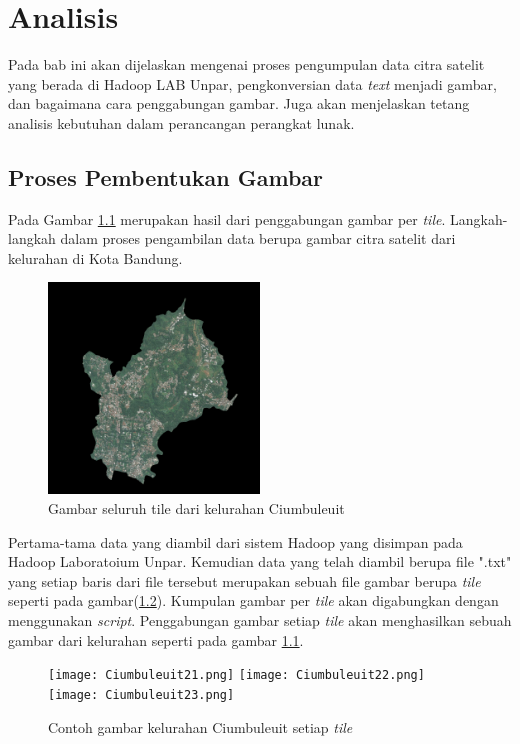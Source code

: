 \chapter{Analisis}
\label{chap:analisis}
Pada bab ini akan dijelaskan mengenai proses pengumpulan data citra satelit yang berada di Hadoop LAB Unpar, pengkonversian data \textit{text} menjadi gambar, dan bagaimana cara penggabungan gambar. Juga akan menjelaskan tetang analisis kebutuhan dalam perancangan perangkat lunak. 

\section{Proses Pembentukan Gambar}
Pada Gambar \ref{fig:ciumbuleuit} merupakan hasil dari penggabungan gambar per \textit{tile}. Langkah-langkah dalam proses pengambilan data berupa gambar citra satelit dari kelurahan di Kota Bandung. 
\begin{figure}[H]
	\centering
	\includegraphics[width=0.5\textwidth]{Gambar/Ciumbuleuit.png}
	\caption{Gambar seluruh tile dari kelurahan Ciumbuleuit}
	\label{fig:ciumbuleuit}
\end{figure} 

Pertama-tama data yang diambil dari sistem Hadoop yang disimpan pada Hadoop Laboratoium Unpar. Kemudian data yang telah diambil berupa file ".txt" yang setiap baris dari file tersebut merupakan sebuah file gambar berupa \textit{tile} seperti pada gambar(\ref{fig:tileCiumbuleuit}). Kumpulan gambar per \textit{tile} akan digabungkan dengan menggunakan \textit{script}. Penggabungan gambar setiap \textit{tile} akan menghasilkan sebuah gambar dari kelurahan seperti pada gambar \ref{fig:ciumbuleuit}.
\begin{figure}[H]
	\centering
	\texttt{[image: Ciumbuleuit21.png]}
	\texttt{[image: Ciumbuleuit22.png]}
	\texttt{[image: Ciumbuleuit23.png]}
	\caption{Contoh gambar kelurahan Ciumbuleuit setiap \textit{tile}}
	\label{fig:tileCiumbuleuit}
\end{figure}

